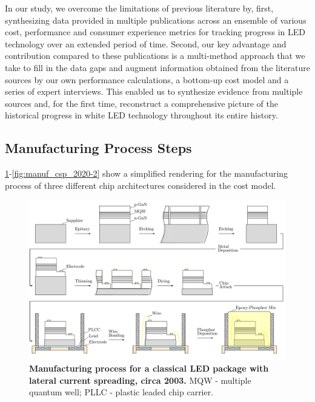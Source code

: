\documentclass[parskip=full]{article}
\begin{document}
In our study, we overcome the limitations of previous literature by, first, synthesizing data provided in multiple publications across an ensemble of various cost, performance and consumer experience metrics for tracking progress in LED technology over an extended period of time. Second, our key advantage and contribution compared to these publications is a multi-method approach that we take to fill in the data gaps and augment information obtained from the literature sources by our own performance calculations, a bottom-up cost model and a series of expert interviews. This enabled us to synthesize evidence from multiple sources and, for the first time, reconstruct a comprehensive picture of the historical progress in white LED technology throughout its entire history.

\subsection{Manufacturing Process Steps}
\label{sec:manufacturing_steps}

\cref{fig:manuf_classical_2003}-\cref{fig:manuf_csp_2020-2} show a simplified rendering for the manufacturing process of three different chip architectures considered in the cost model.

\vspace{-20mm}


    \begin{landscape}
        \begin{figure}
            \includegraphics[width=555pt]{./figures/classical_overview_2003.pdf}
            \caption{\textbf{Manufacturing process for a classical LED package with lateral current spreading, circa 2003.} MQW - multiple quantum well; PLLC - plastic leaded chip carrier.}
        \label{fig:manuf_classical_2003}
        \end{figure}
    \end{landscape}
    
\end{document}
